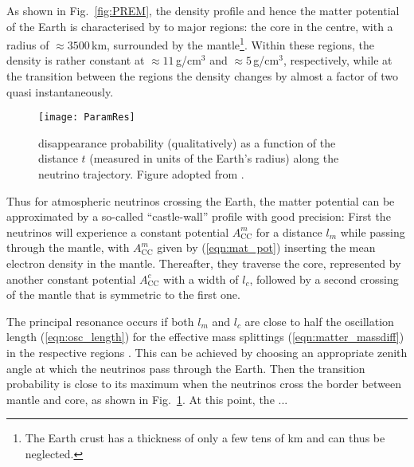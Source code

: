 As shown in Fig.~\ref{fig:PREM}, the density profile and hence the matter 
potential of the Earth is characterised by to major regions: the core in the 
centre, with a radius of $\approx 3500$\,km, surrounded by the 
mantle\footnote{The Earth crust has a thickness of only a few tens of km and 
can thus be neglected.}. Within these regions, the density is rather constant 
at $\approx 11$\,g/cm$^3$ and $\approx 5$\,g/cm$^3$, respectively, while at the 
transition between the regions the density changes by almost a factor of two 
quasi instantaneously. 

\begin{figure}[th]
 \centering
 \texttt{[image: ParamRes]}
 \caption[\nue disappearance probability (qualitatively) as a
  function  of the distance $t$ (measured in units of the Earth's radius) along
  the  neutrino trajectory. Figure adopted from \cite{ParamRes2}.]
  {\nue disappearance probability (qualitatively\footnotemark) as a  function
  of the distance $t$ (measured in units of the Earth's radius) along  the
  neutrino trajectory. Figure adopted from \cite{ParamRes2}.}
 \label{fig:ParamRes}
\end{figure}

Thus for atmospheric neutrinos crossing the Earth, the matter potential can be 
approximated by a so-called ``castle-wall'' profile with good precision: First 
the neutrinos will experience a constant potential $A_\mathrm{CC}^m$ for a 
distance $l_m$ while passing through the mantle, with $A_\mathrm{CC}^m$ given 
by (\ref{eqn:mat_pot}) inserting the mean electron density in the mantle. 
Thereafter, they traverse the core, represented by another constant potential 
$A_\mathrm{CC}^c$ with a width of $l_c$, followed by a second crossing of the 
mantle that is symmetric to the first one.


The principal resonance occurs if both $l_m$ and $l_c$ are close to half the
oscillation length (\ref{eqn:osc_length}) for the effective mass splittings 
(\ref{eqn:matter_massdiff}) in the respective regions \cite{ParamRes,
ParamRes2}. This can be achieved by choosing an appropriate zenith angle at
which the neutrinos pass through the Earth. Then the transition probability is
close to its maximum when the neutrinos cross the border between mantle and
core, as shown in Fig.~\ref{fig:ParamRes}.
At this point, the ...

